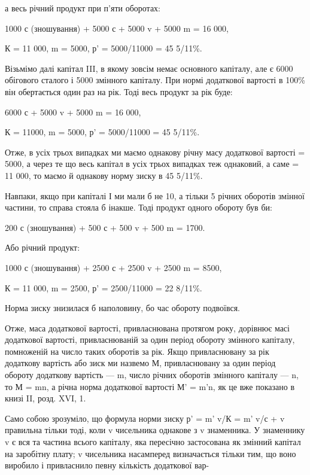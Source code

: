 а весь річний продукт при п’яти оборотах:

1000 с (зношування) + 5000 с + 5000 v + 5000 m = 16 000,

К = 11 000, m = 5000, р' = 5000/11000 = 45 5/11\%.

Візьмімо далі капітал III, в якому зовсім немає основного капіталу,
але є 6000 обігового сталого і 5000 змінного капіталу.
При нормі додаткової вартості в 100\% він обертається один раз
на рік. Тоді весь продукт за рік буде:

6000 с + 5000 v + 5000 m = 16 000,

К = 11000, m = 5000, р' = 5000/11000 = 45 5/11\%.

Отже, в усіх трьох випадках ми маємо однакову річну масу
додаткової вартості = 5000, а через те що весь капітал в усіх
трьох випадках теж однаковий, а саме = 11 000, то маємо
й однакову норму зиску в 45 5/11\%.

Навпаки, якщо при капіталі І ми мали б не 10, а тільки
5 річних оборотів змінної частини, то справа стояла б інакше.
Тоді продукт одного обороту був би:

200 с (зношування) + 500 с + 500 v + 500 m = 1700.

Або річний продукт:

1000 с (зношування) + 2500 с + 2500 v + 2500 m = 8500,

К = 11 000, m = 2500, р' = 2500/11000 = 22 8/11\%.

Норма зиску знизилася б наполовину, бо час обороту подвоївся.

Отже, маса додаткової вартості, привласнювана протягом року,
дорівнює масі додаткової вартості, привласнюваній за один період
обороту змінного капіталу, помноженій на число таких оборотів
за рік. Якщо привласнювану за рік додаткову вартість або зиск
ми назвемо М, привласнювану за один період обороту додаткову
вартість — m, число річних оборотів змінного капіталу — n, то
М = mn, а річна норма додаткової вартості М' = m'n, як це
вже показано в книзі II, розд. XVI, 1.

Само собою зрозуміло, що формула норми зиску р' = m' v/К =
m' v/с + v правильна тільки тоді, коли v чисельника однакове
з v знаменника. У знаменнику v є вся та частина всього капіталу,
яка пересічно застосована як змінний капітал на заробітну
плату; v чисельника насамперед визначається тільки тим, що
воно виробило і привласнило певну кількість додаткової вар-
